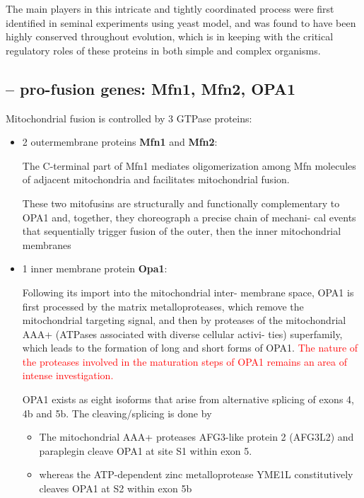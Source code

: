 The main players in this intricate and tightly coordinated process were first
identified in seminal experiments using yeast model, and was found to have been
highly conserved throughout evolution, which is in keeping with the critical
regulatory roles of these proteins in both simple and complex organisms.


\subsection{-- pro-fusion genes: Mfn1, Mfn2, OPA1}

Mitochondrial fusion is controlled by 3 GTPase proteins: 
\begin{itemize}

  \item 2 outermembrane proteins {\bf Mfn1} and {\bf Mfn2}:

\label{sec:Mfn1}
\label{sec:Mfn2}
  The  C-terminal part of Mfn1 mediates oligomerization among Mfn molecules of
  adjacent mitochondria and facilitates mitochondrial fusion.
  
  These two mitofusins are structurally and functionally complementary to OPA1
  and, together, they choreograph a precise chain of mechani- cal events that
  sequentially trigger fusion of the outer, then the inner mitochondrial
  membranes

  \item 1 inner membrane protein
  {\bf Opa1}:
  
  \label{sec:OPA1}
  Following its import into the mitochondrial inter- membrane space, OPA1 is
  first processed by the matrix metalloproteases, which remove the mitochondrial
  targeting signal, and then by proteases of the mitochondrial AAA+ (ATPases
  associated with diverse cellular activi- ties) superfamily, which leads to the
  formation of long and short forms of OPA1. \textcolor{red}{The nature of the
  proteases involved in the maturation steps of OPA1 remains an area of intense
  investigation.}
  
  OPA1 exists as eight isoforms that arise from alternative splicing of exons 4,
  4b and 5b. The cleaving/splicing is done by
  \begin{itemize}
    
    \item  The mitochondrial AAA+ proteases AFG3-like protein 2 (AFG3L2) and paraplegin
  cleave OPA1 at site S1 within exon 5.
  
    \item whereas the ATP-dependent zinc metalloprotease YME1L constitutively
    cleaves OPA1 at S2 within exon 5b


\end{itemize}
\end{itemize}
